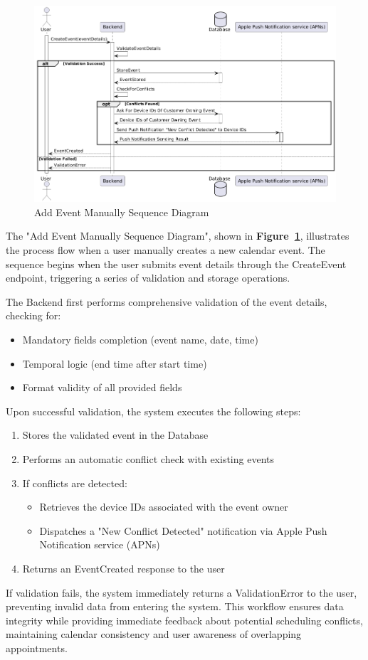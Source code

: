 \begin{figure}[!h]
  \centering
  \includegraphics[width=\textwidth]{images/docs/diagrams/sequence-diagrams/all-sequence-diagrams/Add Event Manually.png}
  \caption{Add Event Manually Sequence Diagram}
  \label{fig:seq/add-event-manually}
\end{figure}

The "Add Event Manually Sequence Diagram", shown in \textbf{Figure~\ref{fig:seq/add-event-manually}}, illustrates the process flow when a user manually creates a new calendar event. The sequence begins when the user submits event details through the CreateEvent endpoint, triggering a series of validation and storage operations.

The Backend first performs comprehensive validation of the event details, checking for:
\begin{itemize}
  \item Mandatory fields completion (event name, date, time)
  \item Temporal logic (end time after start time)
  \item Format validity of all provided fields
\end{itemize}

Upon successful validation, the system executes the following steps:
\begin{enumerate}
  \item Stores the validated event in the Database
  \item Performs an automatic conflict check with existing events
  \item If conflicts are detected:
        \begin{itemize}
          \item Retrieves the device IDs associated with the event owner
          \item Dispatches a "New Conflict Detected" notification via Apple Push Notification service (APNs)
        \end{itemize}
  \item Returns an EventCreated response to the user
\end{enumerate}

If validation fails, the system immediately returns a ValidationError to the user, preventing invalid data from entering the system. This workflow ensures data integrity while providing immediate feedback about potential scheduling conflicts, maintaining calendar consistency and user awareness of overlapping appointments.